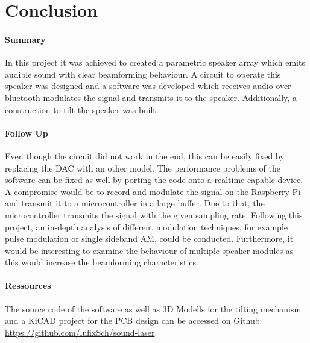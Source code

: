 \chapter{Conclusion}


\subsubsection*{Summary}

In this project it was achieved to created a parametric speaker array which emits audible sound with clear beamforming behaviour. A circuit to operate this speaker was designed and a software was developed which receives audio over bluetooth modulates the signal and transmits it to the speaker. Additionally, a construction to tilt the speaker was built.
%
\subsubsection*{Follow Up}
%
Even though the circuit did not work in the end, this can be easily fixed by replacing the DAC with an other model. The performance problems of the software can be fixed as well by porting the code onto a realtime capable device. A compromise would be to record and modulate the signal on the Raspberry Pi and transmit it to a microcontroller in a large buffer. Due to that, the microcontroller transmits the signal with the given sampling rate.\p
%
Following this project, an in-depth analysis of different modulation techniques, for example pulse modulation or single sideband AM, could be conducted. Furthermore, it would be interesting to examine the behaviour of multiple speaker modules as this would increase the beamforming characteristics.
%
\subsubsection*{Ressources}
%
The source code of the software as well as 3D Modells for the tilting mechanism and a KiCAD project for the PCB design can be accessed on Github: \href{https://github.com/lufixSch/sound-laser}{https://github.com/lufixSch/sound-laser}.